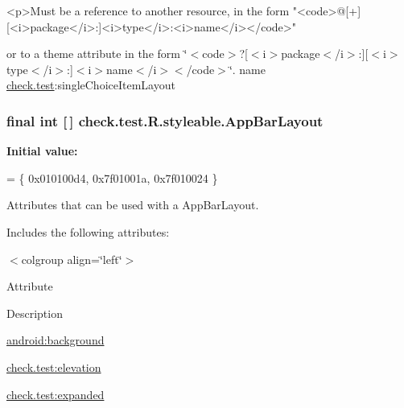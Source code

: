 \begin{DoxyVerb}      <p>Must be a reference to another resource, in the form "<code>@[+][<i>package</i>:]<i>type</i>:<i>name</i></code>"
\end{DoxyVerb}
 or to a theme attribute in the form \char`\"{}$<$code$>$?\mbox{[}$<$i$>$package$<$/i$>$\+:\mbox{]}\mbox{[}$<$i$>$type$<$/i$>$\+:\mbox{]}$<$i$>$name$<$/i$>$$<$/code$>$\char`\"{}.  name \hyperlink{namespacecheck_1_1test}{check.\+test}\+:single\+Choice\+Item\+Layout \hypertarget{classcheck_1_1test_1_1_r_1_1styleable_ac38bda3bc57af07b7730c8f4a05b2049}{}
\subsubsection[{App\+Bar\+Layout}]{\setlength{\rightskip}{0pt plus 5cm}final int \mbox{[}$\,$\mbox{]} check.\+test.\+R.\+styleable.\+App\+Bar\+Layout\hspace{0.3cm}{\ttfamily [static]}}\label{classcheck_1_1test_1_1_r_1_1styleable_ac38bda3bc57af07b7730c8f4a05b2049}
{\bfseries Initial value\+:}
\begin{DoxyCode}
= \{
            0x010100d4, 0x7f01001a, 0x7f010024
        \}
\end{DoxyCode}
Attributes that can be used with a App\+Bar\+Layout. 

Includes the following attributes\+:

\begin{TabularC}{0}
\hline
\end{TabularC}
$<$colgroup align=\char`\"{}left\char`\"{}$>$ 

Attribute

Description 

{\ttfamily \hyperlink{classcheck_1_1test_1_1_r_1_1styleable_a74c1c6d08d529edbb508f5d37e4e292e}{android\+:background}}

{\ttfamily \hyperlink{classcheck_1_1test_1_1_r_1_1styleable_ab651c6ae78f517b87aa0dd36e0c75dbd}{check.\+test\+:elevation}}

{\ttfamily \hyperlink{classcheck_1_1test_1_1_r_1_1styleable_a72cf6dabc14227ec4824c24626692296}{check.\+test\+:expanded}}

